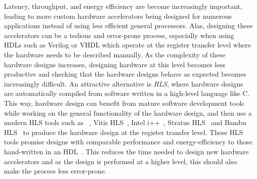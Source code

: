 
Latency, throughput, and energy efficiency are become increasingly important,
leading to more custom hardware accelerators being designed for numerous
applications instead of using less efficient general processors.  Alas,
designing these accelerators can be a tedious and error-prone process,
especially when using \glspl{HDL} such as Verilog or VHDL which operate at the
register transfer level where the hardware needs to be described manually.  As
the complexity of these hardware designs increases, designing hardware at this
level becomes less productive and checking that the hardware designs behave as
expected becomes increasingly difficult.  An attractive alternative is
\emph{\gls{HLS}}, where hardware designs are automatically compiled from
software written in a high-level language like C.  This way, hardware design can
benefit from mature software development tools while working on the general
functionality of the hardware design, and then use a modern \gls{HLS} tools such
as \legup{}~\cite{canis13_l}, Vitis HLS~\cite{amd23_vitis_high_synth}, Intel
i++~\cite{intel20_hsc}, Stratus HLS~\cite{roane23_autom_hw_sw_co_desig} and
Bambu HLS~\cite{pilato13_bambu} to produce the hardware design at the register
transfer level.  These \gls{HLS} tools promise designs with comparable
performance and energy-efficiency to those hand-written in an
\gls{HDL}~\cite{homsirikamol14_can, gauthier20_high_level_synth,
  pelcat16_desig_hdl}.  This reduces the time needed to design new hardware
accelerators and as the design is performed at a higher level, this should also
make the process less error-prone.

